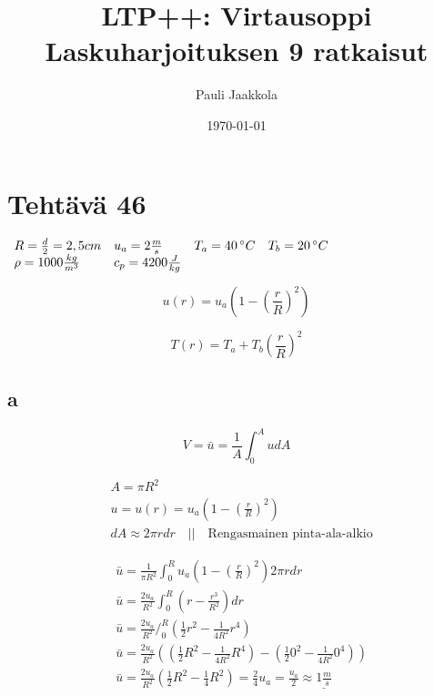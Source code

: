 \documentclass[12pt,a4paper,finnish]{article}
\title{LTP++: Virtausoppi\\Laskuharjoituksen 9 ratkaisut}
\date{\today}
\author{Pauli Jaakkola}
\begin{document}
\maketitle
\tableofcontents
\newpage

\section{Tehtävä 46}

\begin{math}
 \begin{array}{l l l l}
  R = \frac{d}{2} = 2,5 cm & u_a = 2\frac{m}{s} & T_a = 40 \,^{\circ}C & T_b = 20 \,^{\circ}C\\
  \rho = 1000 \frac{kg}{m^3} & c_p = 4200 \frac{J}{kg}
 \end{array}
\end{math}

\begin{equation}
 u(r) = u_a\left(1 - \left(\frac{r}{R}\right)^2\right)
\end{equation}

\begin{equation}
 T(r) = T_a + T_b\left(\frac{r}{R}\right)^2
\end{equation}

\subsection{a} \label{46a}

\begin{framed}
 \begin{equation}
  V = \bar{u} = \frac{1}{A}\int_0^AudA
 \end{equation}
\end{framed}

\begin{align}
 &A = \pi R^2\\
 &u = u(r) = u_a\left(1 - \left(\frac{r}{R}\right)^2\right)\\
 &dA \approx 2\pi rdr \quad \bigg|\bigg| \quad \text{Rengasmainen pinta-ala-alkio}
\end{align}

\begin{align}
 &\bar{u} = \frac{1}{\pi R^2}\int_0^Ru_a\left(1 - \left(\frac{r}{R}\right)^2\right)
   2\pi rdr\\
 &\bar{u} = \frac{2u_a}{R^2}\int_0^R\left(r - \frac{r^3}{R^2}\right)dr\\
 &\bar{u} = \frac{2u_a}{R^2}\bigg/_0^R\left(\frac{1}{2}r^2 - \frac{1}{4R^2}r^4\right)\\
 &\bar{u} = \frac{2u_a}{R^2}\left(\left(\frac{1}{2}R^2 - \frac{1}{4R^2}R^4\right) - 
   \left(\frac{1}{2}0^2 - \frac{1}{4R^2}0^4\right)\right)\\
 &\bar{u} = \frac{2u_a}{R^2}\left(\frac{1}{2}R^2 - \frac{1}{4}R^2\right)
   = \frac{2}{4}u_a = \frac{u_a}{2} \approx \underline{1 \frac{m}{s}}
\end{align}
\end{document}
